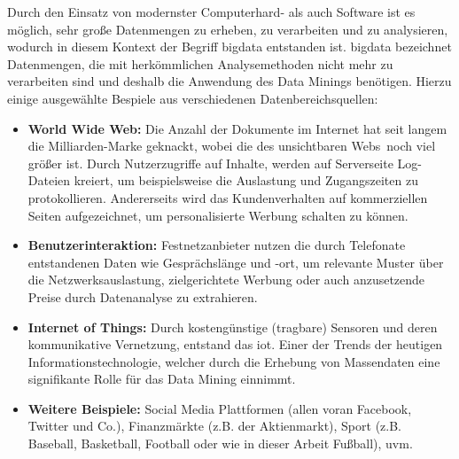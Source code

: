 Durch den Einsatz von modernster Computerhard- als auch Software ist es möglich, sehr große Datenmengen zu erheben, zu verarbeiten und zu analysieren, wodurch in diesem Kontext der Begriff \gls{bigdata} entstanden ist. \gls{bigdata} bezeichnet Datenmengen, die mit herkömmlichen Analysemethoden nicht mehr zu verarbeiten sind und deshalb die Anwendung des Data Minings benötigen. Hierzu einige ausgewählte Bespiele aus verschiedenen Datenbereichsquellen:

\begin{itemize}
\item \textbf{World Wide Web:} Die Anzahl der Dokumente im Internet hat seit langem die Milliarden-Marke geknackt, wobei die des unsichtbaren \glqq Webs\grqq~noch viel größer ist. Durch Nutzerzugriffe auf Inhalte, werden auf Serverseite Log-Dateien kreiert, um beispielsweise die Auslastung und Zugangszeiten zu protokollieren. Andererseits wird das Kundenverhalten auf kommerziellen Seiten aufgezeichnet, um personalisierte Werbung schalten zu können.

\item \textbf{Benutzerinteraktion:} Festnetzanbieter nutzen die durch Telefonate entstandenen Daten wie Gesprächslänge und -ort, um relevante Muster über die Netzwerksauslastung, zielgerichtete Werbung oder auch anzusetzende Preise durch Datenanalyse zu extrahieren.
\item \textbf{Internet of Things:} Durch kostengünstige (tragbare) Sensoren und deren kommunikative Vernetzung, entstand das \gls{iot}. Einer der Trends der heutigen Informationstechnologie, welcher durch die Erhebung von Massendaten eine signifikante Rolle für das Data Mining einnimmt.

\item \textbf{Weitere Beispiele:}  Social Media Plattformen (allen voran Facebook, Twitter und Co.), Finanzmärkte (z.B. der Aktienmarkt), Sport (z.B. Baseball, Basketball, Football oder wie in dieser Arbeit Fußball), uvm. 
\end{itemize}

